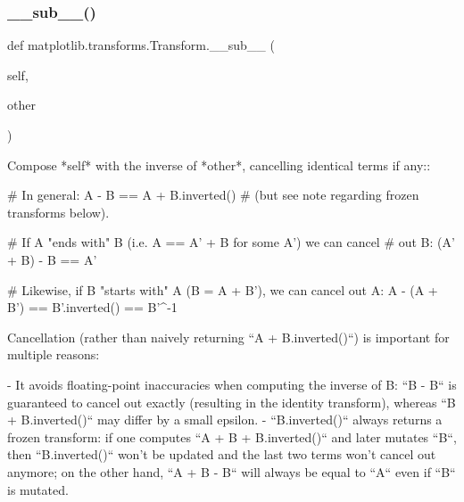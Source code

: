 \mbox{\label{classmatplotlib_1_1transforms_1_1Transform_a0d3d7f11e49556cea178d7110350572d}} 
\subsubsection{\texorpdfstring{\+\_\+\+\_\+sub\+\_\+\+\_\+()}{\_\_sub\_\_()}}
{\footnotesize\ttfamily def matplotlib.\+transforms.\+Transform.\+\_\+\+\_\+sub\+\_\+\+\_\+ (\begin{DoxyParamCaption}\item[{}]{self,  }\item[{}]{other }\end{DoxyParamCaption})}

\begin{DoxyVerb}Compose *self* with the inverse of *other*, cancelling identical terms
if any::

    # In general:
    A - B == A + B.inverted()
    # (but see note regarding frozen transforms below).

    # If A "ends with" B (i.e. A == A' + B for some A') we can cancel
    # out B:
    (A' + B) - B == A'

    # Likewise, if B "starts with" A (B = A + B'), we can cancel out A:
    A - (A + B') == B'.inverted() == B'^-1

Cancellation (rather than naively returning ``A + B.inverted()``) is
important for multiple reasons:

- It avoids floating-point inaccuracies when computing the inverse of
  B: ``B - B`` is guaranteed to cancel out exactly (resulting in the
  identity transform), whereas ``B + B.inverted()`` may differ by a
  small epsilon.
- ``B.inverted()`` always returns a frozen transform: if one computes
  ``A + B + B.inverted()`` and later mutates ``B``, then
  ``B.inverted()`` won't be updated and the last two terms won't cancel
  out anymore; on the other hand, ``A + B - B`` will always be equal to
  ``A`` even if ``B`` is mutated.
\end{DoxyVerb}
 \mbox{\label{classmatplotlib_1_1transforms_1_1Transform_af83fa5fa2bd74e402f7cf30d0c6d0a75}} 

